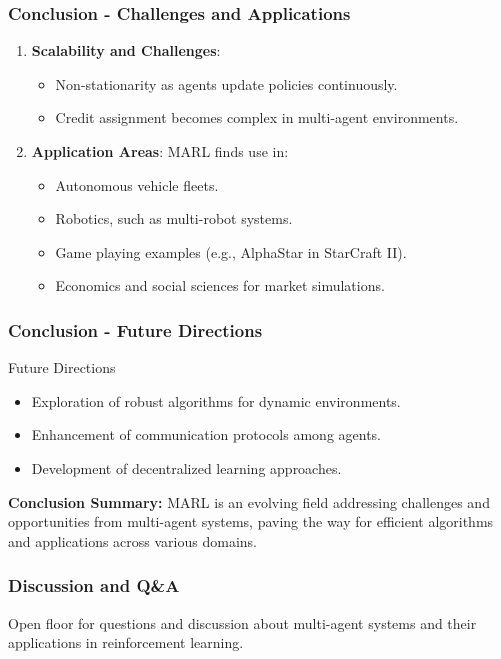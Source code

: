 \documentclass[aspectratio=169]{beamer}
\begin{document}
\begin{frame}[fragile]
    \frametitle{Conclusion - Challenges and Applications}
    \begin{enumerate}
        \item \textbf{Scalability and Challenges}:
        \begin{itemize}
            \item Non-stationarity as agents update policies continuously.
            \item Credit assignment becomes complex in multi-agent environments.
        \end{itemize}

        \item \textbf{Application Areas}:
        MARL finds use in:
        \begin{itemize}
            \item Autonomous vehicle fleets.
            \item Robotics, such as multi-robot systems.
            \item Game playing examples (e.g., AlphaStar in StarCraft II).
            \item Economics and social sciences for market simulations.
        \end{itemize}
    \end{enumerate}
\end{frame}

\begin{frame}[fragile]
    \frametitle{Conclusion - Future Directions}
    \begin{block}{Future Directions}
        \begin{itemize}
            \item Exploration of robust algorithms for dynamic environments.
            \item Enhancement of communication protocols among agents.
            \item Development of decentralized learning approaches.
        \end{itemize}
    \end{block}

    \textbf{Conclusion Summary:}
    MARL is an evolving field addressing challenges and opportunities from multi-agent systems, paving the way for efficient algorithms and applications across various domains.
\end{frame}

\begin{frame}[fragile]
    \frametitle{Discussion and Q\&A}
    Open floor for questions and discussion about multi-agent systems and their applications in reinforcement learning.
\end{frame}
\end{document}
